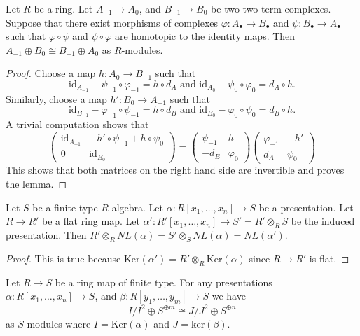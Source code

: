 \begin{lemma}
\label{lemma-sum-two-terms}
Let $R$ be a ring.
Let $A_{-1} \to A_0$, and $B_{-1} \to B_0$ be
two two term complexes. Suppose that there exist
morphisms of complexes $\varphi : A_\bullet \to B_\bullet$
and $\psi : B_\bullet \to A_\bullet$ such that
$\varphi \circ \psi$ and $\psi \circ \varphi$ are
homotopic to the identity maps.
Then $A_{-1} \oplus B_0 \cong B_{-1} \oplus A_0$ as
$R$-modules.
\end{lemma}

\begin{proof}
Choose a map $h : A_0 \to B_{-1}$ such that
$$
\text{id}_{A_{-1}} - \psi_{-1} \circ \varphi_{-1} = h \circ d_A
\text{ and }
\text{id}_{A_0} - \psi_0 \circ \varphi_0 = d_A \circ h.
$$
Similarly, choose a map $h' : B_0 \to A_{-1}$ such that
$$
\text{id}_{B_{-1}} - \varphi_{-1} \circ \psi_{-1} = h \circ d_B
\text{ and }
\text{id}_{B_0} - \varphi_0 \circ \psi_0 = d_B \circ h.
$$
A trivial computation shows that
$$
\left(
\begin{matrix}
\text{id}_{A_{-1}} & -h' \circ \psi_{-1} + h \circ \psi_0 \\
0 & \text{id}_{B_0}
\end{matrix}
\right)
=
\left(
\begin{matrix}
\psi_{-1} & h \\
-d_B & \varphi_0
\end{matrix}
\right)
\left(
\begin{matrix}
\varphi_{-1} & - h' \\
d_A & \psi_0
\end{matrix}
\right)
$$
This shows that both matrices on the right hand side
are invertible and proves the lemma.
\end{proof}

\begin{lemma}
\label{lemma-change-base-NL}
Let $S$ be a finite type $R$ algebra.
Let $\alpha : R[x_1,\ldots,x_n] \to S$ be a presentation.
Let $R \to R'$ be a flat ring map.
Let $\alpha' : R'[x_1, \ldots, x_n] \to S' = R'\otimes_R S$
be the induced presentation.
Then $R' \otimes_R NL(\alpha) = S'\otimes_S NL(\alpha) = NL(\alpha')$.
\end{lemma}

\begin{proof}
This is true because
$\text{Ker}(\alpha') = R' \otimes_R \text{Ker}(\alpha)$
since $R \to R'$ is flat.
\end{proof}


\begin{lemma}
\label{lemma-conormal-module}
Let $R \to S$ be a ring map of finite type.
For any presentations $\alpha : R[x_1,\ldots,x_n] \to S$, and
$\beta : R[y_1,\ldots,y_m] \to S$ we have
$$
I/I^2 \oplus S^{\oplus m} \cong J/J^2 \oplus S^{\oplus n}
$$
as $S$-modules where $I = \text{Ker}(\alpha)$ and $J = \text{ker}(\beta)$.
\end{lemma}

